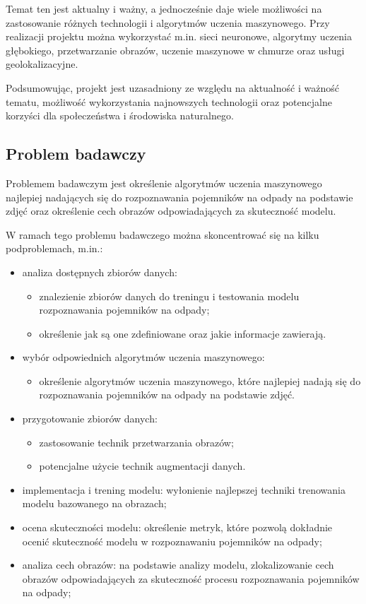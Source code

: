 \documentclass[12pt, a4paper, twoside, openany]{book}
\begin{document}
Temat ten jest aktualny i ważny, a jednocześnie daje wiele możliwości na zastosowanie różnych technologii i algorytmów uczenia maszynowego. Przy realizacji projektu można wykorzystać m.in. sieci neuronowe, algorytmy uczenia głębokiego, przetwarzanie obrazów, uczenie maszynowe w chmurze oraz usługi geolokalizacyjne.

Podsumowując, projekt \topic jest uzasadniony ze względu na aktualność i ważność tematu, możliwość wykorzystania najnowszych technologii oraz potencjalne korzyści dla społeczeństwa i środowiska naturalnego.

\subsection{Problem badawczy}

Problemem badawczym jest określenie algorytmów uczenia maszynowego najlepiej nadających się do rozpoznawania pojemników na odpady na podstawie zdjęć oraz określenie cech obrazów odpowiadających za skuteczność modelu.

W ramach tego problemu badawczego można skoncentrować się na kilku podproblemach, m.in.:
\begin{itemize}
    \item analiza dostępnych zbiorów danych:
          \begin{itemize}
              \item znalezienie zbiorów danych do treningu i testowania modelu rozpoznawania pojemników na odpady;
              \item określenie jak są one zdefiniowane oraz jakie informacje zawierają.
          \end{itemize}
    \item wybór odpowiednich algorytmów uczenia maszynowego:
          \begin{itemize}
              \item określenie algorytmów uczenia maszynowego, które najlepiej nadają się do rozpoznawania pojemników na odpady na podstawie zdjęć.
          \end{itemize}
    \item przygotowanie zbiorów danych:
          \begin{itemize}
              \item zastosowanie technik przetwarzania obrazów;
              \item potencjalne użycie technik augmentacji danych.
          \end{itemize}
    \item implementacja i trening modelu: wyłonienie najlepszej techniki trenowania modelu bazowanego na obrazach;
    \item ocena skuteczności modelu: określenie metryk, które pozwolą dokładnie ocenić skuteczność modelu w rozpoznawaniu pojemników na odpady;
    \item analiza cech obrazów: na podstawie analizy modelu, zlokalizowanie cech obrazów odpowiadających za skuteczność procesu rozpoznawania pojemników na odpady;
\end{itemize}
\end{document}
